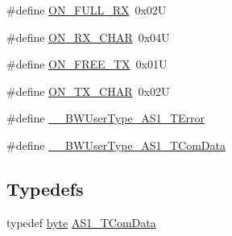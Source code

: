 \begin{DoxyCompactItemize}
\#define \hyperlink{group___a_s1__module_ga2cf6b6a2b8c83f7d1d7e6134c6bd9a4a}{O\+N\+\_\+\+F\+U\+L\+L\+\_\+\+RX}~0x02U
\item 
\#define \hyperlink{group___a_s1__module_gad07f43952e300ba1e45521ce777c09d4}{O\+N\+\_\+\+R\+X\+\_\+\+C\+H\+AR}~0x04U
\item 
\#define \hyperlink{group___a_s1__module_ga71d35387335972e4f6ae07ecccf27724}{O\+N\+\_\+\+F\+R\+E\+E\+\_\+\+TX}~0x01U
\item 
\#define \hyperlink{group___a_s1__module_gaf02aa8bfc7e9b5338168db9ff9077c0d}{O\+N\+\_\+\+T\+X\+\_\+\+C\+H\+AR}~0x02U
\item 
\#define \hyperlink{group___a_s1__module_ga88b60b019dfe95745d800b2c9a0d2197}{\+\_\+\+\_\+\+B\+W\+User\+Type\+\_\+\+A\+S1\+\_\+\+T\+Error}
\item 
\#define \hyperlink{group___a_s1__module_ga5deab30f29af11135db490a516abd823}{\+\_\+\+\_\+\+B\+W\+User\+Type\+\_\+\+A\+S1\+\_\+\+T\+Com\+Data}
\end{DoxyCompactItemize}
\subsection*{Typedefs}
\begin{DoxyCompactItemize}
\item 
typedef \hyperlink{group___p_e___types__module_ga0c8186d9b9b7880309c27230bbb5e69d}{byte} \hyperlink{group___a_s1__module_ga621222f7d90195f6b0edb2abeb534e3b}{A\+S1\+\_\+\+T\+Com\+Data}
\end{DoxyCompactItemize}
